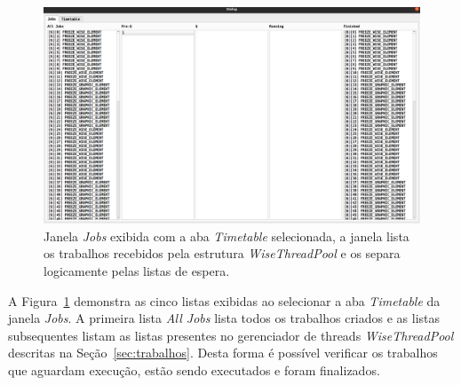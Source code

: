 \begin{figure}[!htbp]
	\centering
	\includegraphics[width=\linewidth]{Figures/IGU_022.png}
	\caption{Janela \textit{Jobs} exibida com a aba \textit{Timetable} selecionada, a janela lista os trabalhos recebidos pela estrutura \textit{WiseThreadPool} e os separa logicamente pelas listas de espera.}
	\label{fig:jobs2}
\end{figure}

A Figura~\ref{fig:jobs2} demonstra as cinco listas exibidas ao selecionar a aba \textit{Timetable} da janela \textit{Jobs}. A primeira lista \textit{All Jobs} lista todos os trabalhos criados e as listas subsequentes listam as listas presentes no gerenciador de threads \textit{WiseThreadPool} descritas na Seção~\ref{sec:trabalhos}. Desta forma é possível verificar os trabalhos que aguardam execução, estão sendo executados e foram finalizados.